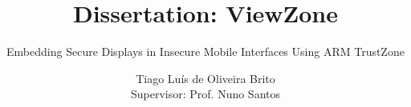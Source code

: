 \documentclass{./llncs2e/llncs}
\begin{document}
\title{Dissertation: ViewZone}

\subtitle{Embedding Secure Displays in Insecure Mobile Interfaces Using ARM TrustZone}
\author{Tiago Luís de Oliveira Brito\\
Supervisor: Prof. Nuno Santos}


\maketitle

\setcounter{secnumdepth}{3}
\setcounter{tocdepth}{3}
\makeatletter
\renewcommand*\l@author[2]{}
\renewcommand*\l@title[2]{}
\makeatletter
\renewcommand\subsubsection{\@startsection{subsubsection}{2}{\z@}%
	{-18\p@ \@plus -4\p@ \@minus -4\p@}%
	{8\p@ \@plus 4\p@ \@minus 4\p@}%
	{\normalfont\normalsize\bfseries\boldmath
		\rightskip=\z@ \@plus 8em\pretolerance=10000 }}


%

\pagestyle{plain}

%





%

%
%



%
\end{document}
